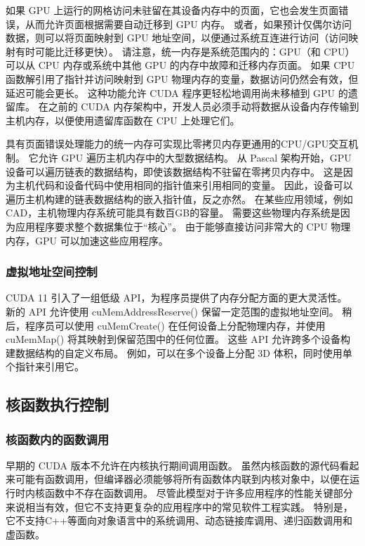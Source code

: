 如果 GPU 上运行的网格访问未驻留在其设备内存中的页面，它也会发生页面错误，从而允许页面根据需要自动迁移到 GPU 内存。 
或者，如果预计仅偶尔访问数据，则可以将页面映射到 GPU 地址空间，以便通过系统互连进行访问（访问映射有时可能比迁移更快）。 
请注意，统一内存是系统范围内的：GPU（和 CPU）可以从 CPU 内存或系统中其他 GPU 的内存中故障和迁移内存页面。 
如果 CPU 函数解引用了指针并访问映射到 GPU 物理内存的变量，数据访问仍然会有效，但延迟可能会更长。 
这种功能允许 CUDA 程序更轻松地调用尚未移植到 GPU 的遗留库。 
在之前的 CUDA 内存架构中，开发人员必须手动将数据从设备内存传输到主机内存，以便使用遗留库函数在 CPU 上处理它们。

具有页面错误处理能力的统一内存可实现比零拷贝内存更通用的CPU/GPU交互机制。 它允许 GPU 遍历主机内存中的大型数据结构。 
从 Pascal 架构开始，GPU 设备可以遍历链表的数据结构，即使该数据结构不驻留在零拷贝内存中。 
这是因为主机代码和设备代码中使用相同的指针值来引用相同的变量。 
因此，设备可以遍历主机构建的链表数据结构的嵌入指针值，反之亦然。 
在某些应用领域，例如CAD，主机物理内存系统可能具有数百GB的容量。 
需要这些物理内存系统是因为应用程序要求整个数据集位于“核心”。 
由于能够直接访问非常大的 CPU 物理内存，GPU 可以加速这些应用程序。

\subsubsection{虚拟地址空间控制}
CUDA 11 引入了一组低级 API，为程序员提供了内存分配方面的更大灵活性。 
新的 API 允许使用 cuMemAddressReserve() 保留一定范围的虚拟地址空间。 
稍后，程序员可以使用 cuMemCreate() 在任何设备上分配物理内存，并使用 cuMemMap() 将其映射到保留范围中的任何位置。 
这些 API 允许跨多个设备构建数据结构的自定义布局。 例如，可以在多个设备上分配 3D 体积，同时使用单个指针来引用它。

\subsection{核函数执行控制}
\subsubsection{核函数内的函数调用}
早期的 CUDA 版本不允许在内核执行期间调用函数。 
虽然内核函数的源代码看起来可能有函数调用，但编译器必须能够将所有函数体内联到内核对象中，以便在运行时内核函数中不存在函数调用。 
尽管此模型对于许多应用程序的性能关键部分来说相当有效，但它不支持更复杂的应用程序中的常见软件工程实践。 
特别是，它不支持C++等面向对象语言中的系统调用、动态链接库调用、递归函数调用和虚函数。


